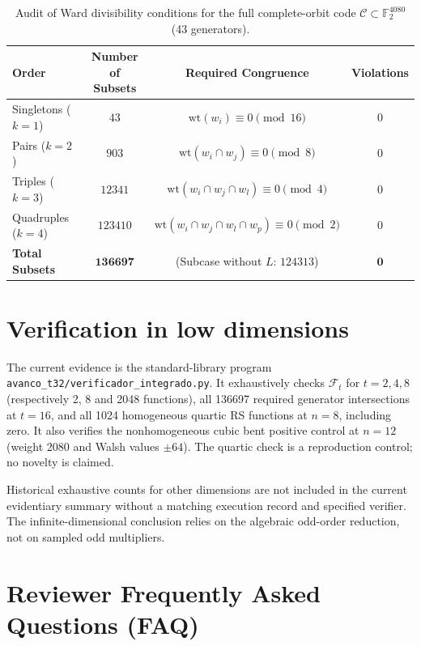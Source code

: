 \documentclass[11pt,a4paper]{article}
\theoremstyle{definition}
\newcommand{\F}{\mathbb{F}_2}
\newcommand{\wt}{\mathrm{wt}}
\begin{document}
\begin{table}[htbp]
\centering
\caption{Audit of Ward divisibility conditions for the full complete-orbit code $\mathcal{C} \subset \F^{4080}$ (43 generators).}
\begin{tabular}{lccc}
\toprule
Order & Number of Subsets & Required Congruence & Violations \\
\midrule
Singletons ($k = 1$) & $43$ & $\wt(w_i) \equiv 0 \pmod{16}$ & $0$ \\
Pairs ($k = 2$) & $903$ & $\wt(w_i \cap w_j) \equiv 0 \pmod 8$ & $0$ \\
Triples ($k = 3$) & $12341$ & $\wt(w_i \cap w_j \cap w_l) \equiv 0 \pmod 4$ & $0$ \\
Quadruples ($k = 4$) & $123410$ & $\wt(w_i \cap w_j \cap w_l \cap w_p) \equiv 0 \pmod 2$ & $0$ \\
\midrule
\textbf{Total Subsets} & $\mathbf{136697}$ & (Subcase without $L$: $124313$) & $\mathbf{0}$ \\
\bottomrule
\end{tabular}
\end{table}

\section{Verification in low dimensions}

The current evidence is the standard-library program \texttt{avanco\_t32/verificador\_integrado.py}. It exhaustively checks $\mathcal F_t$ for $t=2,4,8$ (respectively 2, 8 and 2048 functions), all 136697 required generator intersections at $t=16$, and all 1024 homogeneous quartic RS functions at $n=8$, including zero. It also verifies the nonhomogeneous cubic bent positive control at $n=12$ (weight 2080 and Walsh values $\pm64$). The quartic check is a reproduction control; no novelty is claimed.

Historical exhaustive counts for other dimensions are not included in the current evidentiary summary without a matching execution record and specified verifier. The infinite-dimensional conclusion relies on the algebraic odd-order reduction, not on sampled odd multipliers.

\section{Reviewer Frequently Asked Questions (FAQ)}
\end{document}
